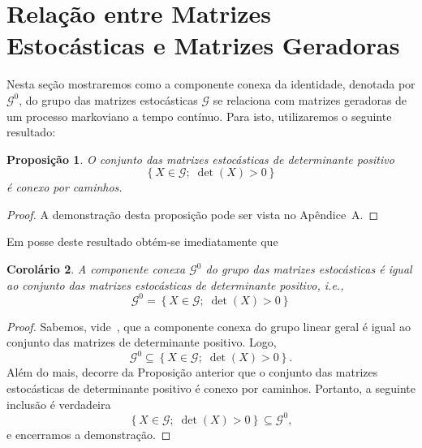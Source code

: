 \documentclass[twoside,openright,titlepage,numbers=noenddot,headinclude,  lineheaders footinclude=true,cleardoublepage=empty,
                                BCOR=5mm,paper=a4,fontsize=12pt ]{scrbook}
\newtheorem{teo}{Teorema}[chapter]
\newtheorem{prop}[teo]{Proposição}
\newtheorem{cor}[teo]{Corolário}
\theoremstyle{definition}
\begin{document}

\section{Rela\c{c}\~ao entre Matrizes Estoc\'asticas e Matrizes Geradoras }
Nesta seção mostraremos como a componente conexa da identidade, denotada por $\mathcal{G}^0$, do grupo
das matrizes estocásticas $\mathcal{G}$ se relaciona
com matrizes geradoras de um processo markoviano a tempo contínuo.
Para isto, utilizaremos o seguinte resultado:
\begin{prop}\label{det}
O conjunto das matrizes estocásticas de determinante positivo
\[
\left\{ X \in \mathcal{G}; \; \det(X) > 0 \right\}
\]
é conexo por caminhos.
\end{prop}
\begin{proof}
A demonstração desta proposição pode ser vista no Apêndice~A.
\end{proof}

Em posse deste resultado obtém-se imediatamente que
\begin{cor} \label{cor:det}
A componente conexa $\mathcal{G}^0$ do grupo das matrizes estocásticas é igual
ao conjunto das matrizes estocásticas de determinante positivo, i.e.,
\[
\mathcal{G}^0  = 
\left\{ X \in \mathcal{G}; \; \det(X) > 0 \right\}
\]
\end{cor}
\begin{proof}
Sabemos, vide~\cite{elon}, que a componente conexa do grupo linear geral 
é igual ao conjunto das matrizes de determinante positivo. Logo, 
\[
\mathcal{G}^0  \subseteq
\left\{ X \in \mathcal{G}; \; \det(X) > 0 \right\}.
\]
Além do mais, decorre da Proposição anterior que o conjunto das matrizes
estocásticas de determinante positivo é conexo por caminhos. Portanto,
a seguinte inclusão é verdadeira
\[
\left\{ X \in \mathcal{G}; \; \det(X) > 0 \right\}
\subseteq \mathcal{G}^0,
\]
e encerramos a demonstração.
\end{proof}

\end{document}
